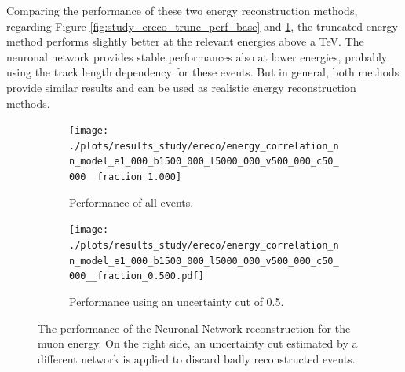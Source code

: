 Comparing the performance of these two energy reconstruction methods, regarding Figure \ref{fig:study_ereco_trunc_perf_base} and \ref{fig:study_ereco_nn_base_perform_all}, the truncated energy method performs slightly better at the relevant energies above a TeV.
The neuronal network provides stable performances also at lower energies, probably using the track length dependency for these events.
But in general, both methods provide similar results and can be used as realistic energy reconstruction methods.
\begin{figure}
    \centering
    \begin{subfigure}{0.47\textwidth}
        \centering
        \texttt{[image: ./plots/results\_study/ereco/energy\_correlation\_nn\_model\_e1\_000\_b1500\_000\_l5000\_000\_v500\_000\_c50\_000\_\_fraction\_1.000]}
        \caption{Performance of all events.}
        \label{fig:study_ereco_nn_base_perform_all}
    \end{subfigure}
    \hfill
    \begin{subfigure}{0.47\textwidth}
        \centering
        \texttt{[image: ./plots/results\_study/ereco/energy\_correlation\_nn\_model\_e1\_000\_b1500\_000\_l5000\_000\_v500\_000\_c50\_000\_\_fraction\_0.500.pdf]}
        \caption{Performance using an uncertainty cut of \num{0.5}.}
        \label{fig:study_ereco_nn_base_perform_unc_05}
    \end{subfigure}
    \caption{The performance of the Neuronal Network reconstruction for the muon energy. On the right side, an uncertainty cut estimated by a different network is applied to discard badly reconstructed events.}
    \label{fig:study_ereco_nn_base_perform}
\end{figure}
